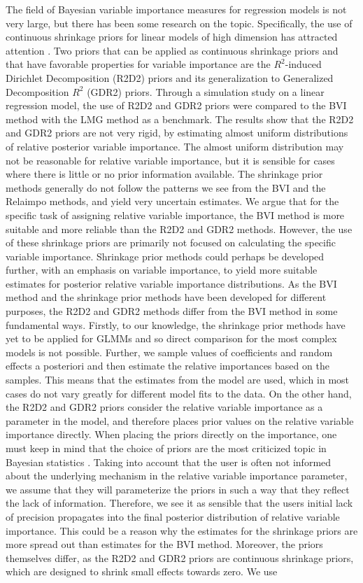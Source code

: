 The field of Bayesian variable importance measures for regression models is not very large, but there has been some research on the topic. Specifically, the use of continuous shrinkage priors for linear models of high dimension has attracted attention \citep{aguilar2024generalized}. Two priors that can be applied as continuous shrinkage priors and that have favorable properties for variable importance are the $R^2$-induced Dirichlet Decomposition (R2D2) priors \citep{zhang2020bayesian} and its generalization to Generalized Decomposition $R^2$ (GDR2) priors. Through a simulation study on a linear regression model, the use of R2D2 and GDR2 priors were compared to the BVI method with the LMG method as a benchmark. The results show that the R2D2 and GDR2 priors are not very rigid, by estimating almost uniform distributions of relative posterior variable importance. The almost uniform distribution may not be reasonable for relative variable importance, but it is sensible for cases where there is little or no prior information available. The shrinkage prior methods generally do not follow the patterns we see from the BVI and the Relaimpo methods, and yield very uncertain estimates. We argue that for the specific task of assigning relative variable importance, the BVI method is more suitable and more reliable than the R2D2 and GDR2 methods. However, the use of these shrinkage priors are primarily not focused on calculating the specific variable importance. Shrinkage prior methods could perhaps be developed further, with an emphasis on variable importance, to yield more suitable estimates for posterior relative variable importance distributions. As the BVI method and the shrinkage prior methods have been developed for different purposes, the R2D2 and GDR2 methods differ from the BVI method in some fundamental ways. Firstly, to our knowledge, the shrinkage prior methods have yet to be applied for GLMMs and so direct comparison for the most complex models is not possible. Further, we sample values of coefficients and random effects a posteriori and then estimate the relative importances based on the samples. This means that the estimates from the model are used, which in most cases do not vary greatly for different model fits to the data. On the other hand, the R2D2 and GDR2 priors consider the relative variable importance as a parameter in the model, and therefore places prior values on the relative variable importance directly. When placing the priors directly on the importance, one must keep in mind that the choice of priors are the most criticized topic in Bayesian statistics \citep{robert2007bayesian}. Taking into account that the user is often not informed about the underlying mechanism in the relative variable importance parameter, we assume that they will parameterize the priors in such a way that they reflect the lack of information. Therefore, we see it as sensible that the users initial lack of precision propagates into the final posterior distribution of relative variable importance. This could be a reason why the estimates for the shrinkage priors are more spread out than estimates for the BVI method. Moreover, the priors themselves differ, as the R2D2 and GDR2 priors are continuous shrinkage priors, which are designed to shrink small effects towards zero. We use 